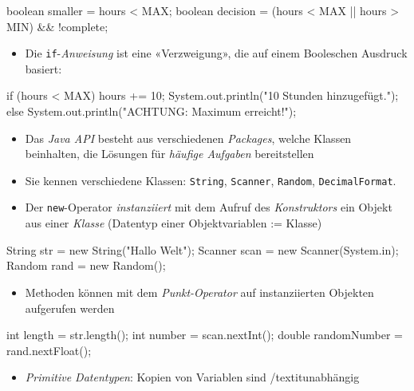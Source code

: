 \documentclass[a4paper,10pt, dvipsnames]{report}
\begin{document}
\begin{javacodebox}
boolean smaller = hours < MAX;
boolean decision = (hours < MAX || hours > MIN) && !complete;
\end{javacodebox}

\begin{itemize}
	\item Die \texttt{if}-\textit{Anweisung} ist eine «Verzweigung», die auf einem Booleschen Ausdruck basiert:
\end{itemize}

\begin{javacodebox}
if (hours < MAX) {
    hours += 10;
    System.out.println("10 Stunden hinzugefügt.");
    } else
    System.out.println("ACHTUNG: Maximum erreicht!");
\end{javacodebox}

\begin{itemize}
    \item Das \textit{Java API} besteht aus verschiedenen \textit{Packages}, welche Klassen beinhalten, die Lösungen für \textit{häufige Aufgaben} bereitstellen
    \item Sie kennen verschiedene Klassen: \texttt{String}, \texttt{Scanner}, \texttt{Random}, \texttt{DecimalFormat}.
    \item Der \texttt{new}-Operator \textit{instanziiert} mit dem Aufruf des \textit{Konstruktors} ein Objekt aus einer \textit{Klasse} (Datentyp einer Objektvariablen := Klasse)
\end{itemize}

\begin{javacodebox}
String str = new String("Hallo Welt");
Scanner scan = new Scanner(System.in);
Random rand = new Random();
\end{javacodebox}

\begin{itemize}
    \item Methoden können mit dem \textit{Punkt-Operator} auf instanziierten Objekten aufgerufen werden
\end{itemize}

\begin{javacodebox}
int length = str.length();
int number = scan.nextInt();
double randomNumber = rand.nextFloat();
\end{javacodebox}

\begin{itemize}
    \item \textit{Primitive Datentypen}: Kopien von Variablen sind /textit{unabhängig}
\end{itemize}
\end{document}
